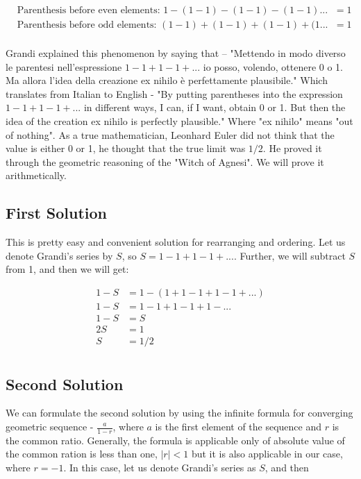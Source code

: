 \documentclass[a4paper]{article}
\begin{document}
\begin{align*}
&\text{Parenthesis before even elements: } 1-(1-1)-(1-1)-(1-1)...&=1\\
&\text{Parenthesis before odd elements: } (1-1)+(1-1)+(1-1)+(1...&=1\\
\end{align*}

Grandi explained this phenomenon by saying that – "Mettendo in modo diverso le parentesi
nell'espressione $1-1+1-1+...$ io posso, volendo, ottenere 0 o 1. Ma allora l'idea della creazione ex
nihilo è perfettamente plausibile."\cite{Mettendo} Which translates from Italian to English - "By putting parentheses into the expression
$1-1+1-1+...$ in different ways, I can, if I want, obtain 0 or 1. But then the idea of the creation
ex nihilo is perfectly plausible." Where "ex nihilo" means "out of nothing".\cite{Exnihilo}
As a true mathematician, Leonhard Euler did not think that the value is either 0 or 1, he thought that the true limit was $1/2$.
He proved it through the geometric reasoning of the "Witch of Agnesi". We will prove it arithmetically.

\subsection{First Solution}

This is pretty easy and convenient solution for rearranging and ordering. Let us denote Grandi’s
series by $S$, so $S=1-1+1-1+...$. Further, we will subtract $S$ from 1, and then we will get:

\begin{align*}
  1-S&=1-(1+1-1+1-1+...)\\
  1-S&=1-1+1-1+1-...\\
  1-S&=S\\
  2S&=1\\
  S&=1/2\\
  \end{align*}

\subsection{Second Solution}

We can formulate the second solution by using the infinite formula for converging geometric
sequence - $\frac{a}{1-r}$, where $a$ is the first element of the sequence and $r$ is the common ratio.
Generally, the formula is applicable only of absolute value of the common ration is less than one, $|r| < 1$ but
it is also applicable in our case, where $r = - 1$. In this case, let us denote Grandi's series as $S$, and
then
\end{document}
